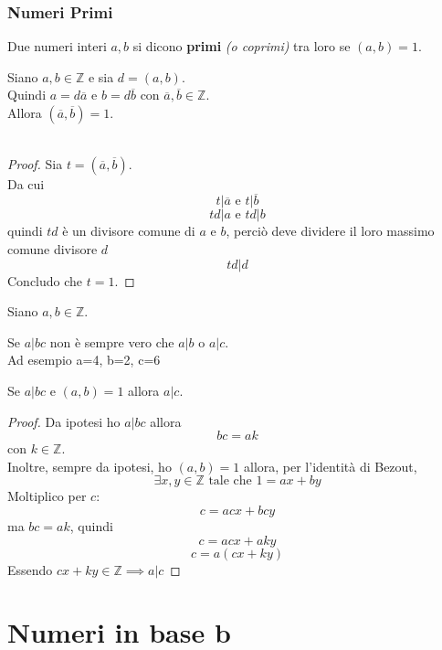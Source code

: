 \documentclass[a4paper,12pt, oneside]{book}
\begin{document}
	\subsection{Numeri Primi}
	\begin{definizione}
		Due numeri interi $a,b$ si dicono \textbf{primi} \textit{(o coprimi)} tra loro se $(a,b) = 1$.
	\end{definizione}
	\begin{osservazione}
		Siano $a,b \in \mathbb{Z}$ e sia $d=(a,b)$.\\
		Quindi $a=d\overline{a}$ e $b=d\overline{b}$ con $\overline{a}, \overline{b} \in \mathbb{Z}$.\\
		Allora $(\overline{a}, \overline{b}) = 1$.\\\\
		\begin{proof}
			Sia $t = (\overline{a}, \overline{b})$.\\
			Da cui $$t|\overline{a} \mbox{ e } t|\overline{b}$$
			$$td|a \mbox{ e } td|b$$
			quindi $td$ è un divisore comune di $a$ e $b$, perciò deve dividere il loro massimo comune divisore $d$
			$$td|d$$
			Concludo che $t = 1$.
		\end{proof}		
	\end{osservazione}
	\begin{osservazione}
		Siano $a,b \in \mathbb{Z}$.
		\begin{shaded}
			\begin{nota}
				Se $a|bc$ non è sempre vero che $a|b$ o $a|c$.\\
				Ad esempio a=4, b=2, c=6
			\end{nota}
		\end{shaded}		
		Se $a|bc$ e $(a,b) = 1$ allora $a|c$.
		
		\begin{proof}
			Da ipotesi ho $a|bc$ allora $$bc = ak$$
			con $k \in \mathbb{Z}$.\\
			Inoltre, sempre da ipotesi, ho $(a,b) = 1$ allora, per l'identità di Bezout,
			$$\exists x,y \in \mathbb{Z} \mbox{ tale che  } 1 = ax+by$$
			Moltiplico per $c$:
			$$c = acx+bcy$$
			ma $bc = ak$, quindi
			$$c = acx+aky$$
			$$c = a(cx+ky)$$
			Essendo $cx+ky \in \mathbb{Z} \implies a|c$
		\end{proof}
		
	\end{osservazione}
	
	
\chapter{Numeri in base \textbf{b}}
\end{document}
